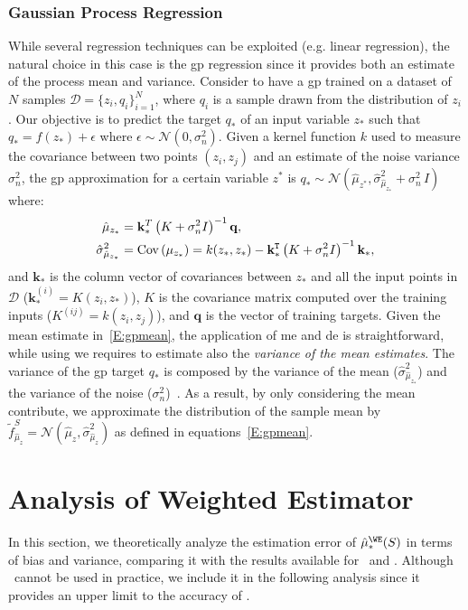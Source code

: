 \subsubsection{Gaussian Process Regression}
While several regression techniques can be exploited (e.g. linear regression), the natural choice in this case is the \gls{gp} regression since it provides both an estimate of the process mean and variance.
Consider to have a \gls{gp} trained on a dataset of $N$ samples $\mathcal{D}=\{z_i, q_i\}_{i=1}^{N}$, where $q_i$ is a sample drawn from the distribution of $z_i$.
Our objective is to predict the target $q_*$ of an input variable $z_*$ such that $q_* = f(z_*) + \epsilon$ where $\epsilon \sim \mathcal{N}(0, \sigma_n^2)$.
Given a kernel function $k$ used to measure the covariance between two points $(z_i,z_j)$ and an estimate of the noise variance $\sigma^2_n$, the \gls{gp} approximation for a certain variable $z^*$ is $q_* \sim \mathcal{N}\left(\hat{\mu}_{z^*}, \hat{\sigma}^2_{\hat{\mu}_{z_*}} + \sigma_n^2\, I \right)$ where:
\begin{align}\label{E:gpmean}
\hat{\mu}_{z_*} &= \mathbf{k}^T_* \left(K + \sigma^2_n I\right)^{-1}\mathbf{q},\\
\nonumber
\hat{\sigma}^2_{\hat{\mu}_{z_*}} &= 
\text{Cov}\left(\mu_{z_*}\right) = k(z_*, z_*) - {\mathbf{k}}^\texttt{T}_* \left( K + \sigma^2_n I \right)^{-1}\mathbf{k}_*,
\end{align}
and $\mathbf{k}_*$ is the column vector of covariances between $z_*$ and all the input points in $\mathcal{D}$ ($\mathbf{k}_*^{(i)} = K(z_i, z_*)$), $K$ is the covariance matrix computed over the training inputs ($K^{(ij)} = k(z_i,z_j)$), and $\mathbf{q}$ is the vector of training targets.
Given the mean estimate in~\ref{E:gpmean}, the application of \gls{me} and \gls{de} is straightforward, while using \gls{we} requires to estimate also the \emph{variance of the mean estimates}.
The variance of the \gls{gp} target $q_*$ is composed by the variance of the mean ($\hat{\sigma}^2_{\hat{\mu}_{z_*}}$) and the variance of the noise ($\sigma^2_n$)~\cite{rasmussen2005gaussian}.
As a result, by only considering the mean contribute, we approximate the distribution of the sample mean by  $\tilde{f}_{\hat{\mu}_z}^S = \mathcal{N}\left(\hat{\mu}_z, \hat{\sigma}^2_{\hat{\mu}_z} \right)$ as defined in equations~\ref{E:gpmean}.

\section{Analysis of Weighted Estimator}
In this section, we theoretically analyze the estimation error of $\est{\WE}(S)$ in terms of bias and variance, comparing it with the results available for \ME~and \CV.
Although \OWE~cannot be used in practice, we include it in the following analysis since it provides an upper limit to the accuracy of \WE.

